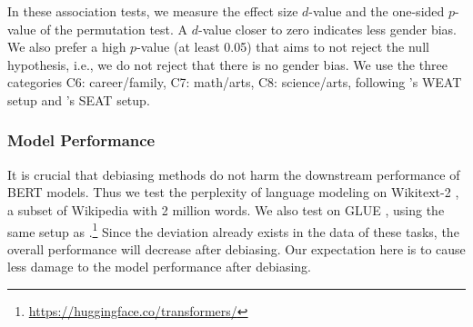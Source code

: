 %
In these association tests, we measure the effect size $d$-value and the
one-sided $p$-value of the permutation test.  A $d$-value closer to zero indicates less gender bias.  We also prefer a high $p$-value (at least 0.05) that aims to not reject the null hypothesis, i.e., we do not reject that there is no gender bias. We use the three categories C6: career/family, C7: math/arts, C8: science/arts, following 's WEAT setup and 's SEAT setup.

\subsubsection{Model Performance}
It is crucial that debiasing methods do not harm the downstream
performance of BERT models. Thus we test the perplexity of language modeling on Wikitext-2 \cite{merity2016pointer}, a subset of Wikipedia with 2 million words. We also test on GLUE  \cite{wang2018glue}, using the same setup as \cite{wolf2019huggingfaces}.\footnote{\url{https://huggingface.co/transformers/}}
Since the deviation already exists in the data of these tasks, 
the overall performance will decrease after debiasing. 
Our expectation here is to cause less damage to the model performance after debiasing.
